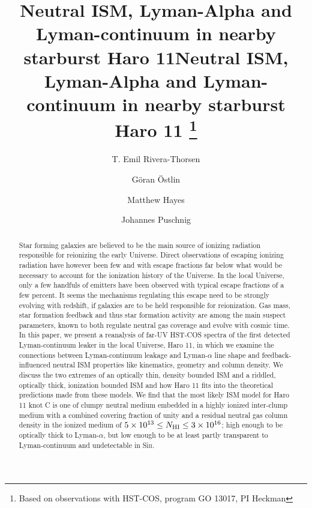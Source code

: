 \documentclass[twocolumn]{aastex61}
\begin{document}
\title{Neutral ISM, Lyman-Alpha and Lyman-continuum in nearby starburst Haro 11}

\title{Neutral ISM, Lyman-Alpha and Lyman-continuum in nearby starburst Haro 11
		                    \footnote{Based on observations with HST-COS, program GO 13017, PI Heckman}
	            }
%

\author{T. Emil Rivera-Thorsen}
\author{Göran Östlin}
\author{Matthew Hayes}
\author{Johannes Puschnig}


\begin{abstract}
Star forming galaxies are believed to be the main source of ionizing
radiation responsible for reionizing the early Universe. Direct
observations of escaping ionizing radiation have however been few and
with escape fractions far below what would be necessary to account for
the ionization history of the Universe. In the local Universe, only a
few handfuls of emitters have been observed with typical escape
fractions of a few percent. It seems the mechanisms regulating this
escape need to be strongly evolving with redshift, if galaxies are to be
held responsible for reionization. Gas mass, star formation feedback and
thus star formation activity are among the main suspect parameters,
known to both regulate neutral gas coverage and evolve with cosmic time.
In this paper, we present a reanalysis of far-UV HST-COS spectra of the
first detected Lyman-continuum leaker in the local Universe, Haro 11, in
which we examine the connections between Lyman-continuum leakage and
Lyman-$\alpha$ line shape and feedback-influenced neutral ISM properties
like kinematics, geometry and column density. We discuss the two
extremes of an optically thin, density bounded ISM and a riddled,
optically thick, ionization bounded ISM and how Haro 11 fits into the
theoretical predictions made from these models. We find that the most
likely ISM model for Haro 11 knot C is one of clumpy neutral medium
embedded in a highly ionized inter-clump medium with a combined covering
fraction of unity and a residual neutral gas column density in the
ionized medium of
$5 \times 10^{13} \leq N_{\rm HI} \leq 3 \times 10^{16}$; high enough to
be optically thick to Lyman-$\alpha$, but low enough to be at least
partly transparent to Lyman-continuum and undetectable in Si\textsc{ii}.
\end{abstract}
\end{document}
